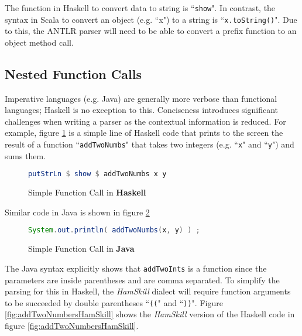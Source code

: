\documentclass{report}
\begin{document}
The function in Haskell to convert data to string is ``{\tt show}". In contrast, the syntax in Scala to convert an object (e.g. ``x") to a string is ``{\tt x.toString()}".  Due to this, the ANTLR parser will need to be able to convert a prefix function to an object method call.

\subsection{Nested Function Calls}

Imperative languages (e.g. Java) are generally more verbose than functional languages; Haskell is no exception to this.  Conciseness introduces significant challenges when writing a parser as the contextual information is reduced.  For example, figure \ref{fig:addTwoNumbersHaskell} is a simple line of Haskell code that prints to the screen the result of a function ``{\tt addTwoNumbs}" that takes two integers (e.g. ``{\tt x}" and ``{\tt y}") and sums them. 

\begin{figure}[H]
\begin{mdframed}
\begin{lstlisting}[language=Haskell]
putStrLn $ show $ addTwoNumbs x y
\end{lstlisting}
\end{mdframed}
\caption{Simple Function Call in \textbf{Haskell}}\label{fig:addTwoNumbersHaskell}
\end{figure}

Similar code in Java is shown in figure \ref{fig:addTwoNumbersJava}

\begin{figure}[H]
\begin{mdframed}
\begin{lstlisting}[language=Java]
System.out.println( addTwoNumbs(x, y) ) ;
\end{lstlisting}
\end{mdframed}
\caption{Simple Function Call in \textbf{Java}}\label{fig:addTwoNumbersJava}
\end{figure}

The Java syntax explicitly shows that {\tt addTwoInts} is a function since the parameters are inside parentheses and are comma separated.  To simplify the parsing for this in Haskell, the \emph{HamSkill} dialect will require function arguments to be succeeded by double parentheses ``{\tt ((}" and ``{\tt ))}".  Figure \ref{fig:addTwoNumbersHamSkill} shows the \emph{HamSkill} version of the Haskell code in figure \ref{fig:addTwoNumbersHamSkill}.
\end{document}
